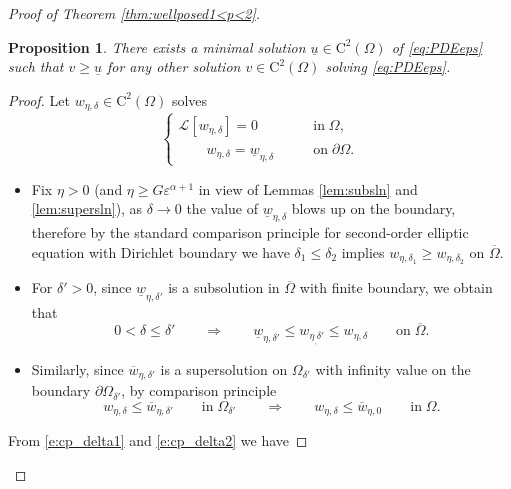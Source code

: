 \documentclass[11pt,reqno]{amsart}
\numberwithin{figure}{section}
\theoremstyle{plain}
\newtheorem{prop}[thm]{Proposition}
\theoremstyle{remark}
\numberwithin{equation}{section}
\begin{document}
\begin{appendices}
\begin{proof} [Proof of Theorem \ref{thm:wellposed1<p<2}]
\begin{prop}\label{pro:minimalsol} There exists a minimal solution $\underline{u}\in \mathrm{C}^2(\Omega)$ of \eqref{eq:PDEeps} such that $v\geq \underline{u}$ for any other solution $v\in \mathrm{C}^2(\Omega)$ solving \eqref{eq:PDEeps}.
\end{prop}
\begin{proof} Let $w_{\eta,\delta}\in \mathrm{C}^2(\Omega)$ solves
    \begin{equation}\label{e:w_def}
    \begin{cases}
        \mathcal{L}\left[w_{\eta,\delta}\right] = 0 &\qquad\text{in}\;\Omega,\\
        \qquad w_{\eta,\delta} = \underline{w}_{\eta,\delta} &\qquad\text{on}\;\partial\Omega.
    \end{cases}
    \end{equation}
    \begin{itemize}
        \item Fix $\eta>0$ (and $\eta\geq G\varepsilon^{\alpha+1}$ in view of Lemmas \ref{lem:subsln} and \ref{lem:supersln}), as $\delta\to 0$ the value of $\underline{w}_{\eta,\delta}$ blows up on the boundary, therefore by the standard comparison principle for second-order elliptic equation with Dirichlet boundary we have $\delta_1 \leq  \delta_2$ implies $w_{\eta,\delta_1}\geq  w_{\eta,\delta_2}$ on $\overline{\Omega}$. 
        \item For $\delta'>0$, since $\underline{w}_{\eta,\delta'}$ is a subsolution in $\overline{\Omega}$ with finite boundary, we obtain that
            \begin{equation}\label{e:cp_delta1}
                0<\delta \leq \delta'\qquad\Longrightarrow\qquad \underline{w}_{\eta,\delta'} \leq w_{\eta_,\delta'}\leq w_{\eta,\delta} \qquad\text{on}\;\overline{\Omega}.
            \end{equation}
        \item Similarly, since $\overline{w}_{\eta,\delta'}$ is a supersolution on $\Omega_{\delta'}$ with infinity value on the boundary $\partial\Omega_{\delta'}$, by comparison principle
            \begin{equation}\label{e:cp_delta2}
                w_{\eta,\delta} \leq \overline{w}_{\eta, \delta'} \qquad\text{in}\;\Omega_{\delta'} \qquad\Longrightarrow\qquad w_{\eta,\delta} \leq \overline{w}_{\eta,0} \qquad\text{in}\;\Omega.
            \end{equation}
    \end{itemize}
    \noindent From \eqref{e:cp_delta1} and \eqref{e:cp_delta2} we have

\end{proof}
\end{proof}
\end{appendices}
\end{document}
